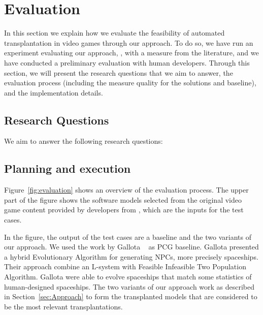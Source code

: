 \section{Evaluation} \label{sec:Evaluation}

In this section we explain how we evaluate the feasibility of automated transplantation in video games through our \ApproachName{} approach. To do so, we have run an experiment evaluating our approach, \ApproachName, with a measure from the literature, and we have conducted a preliminary evaluation with human developers.
Through this section, we will present the research questions that we aim to answer, the evaluation
process (including the measure quality for the solutions and baseline), and the implementation details.

\subsection{Research Questions}
We aim to answer the following research questions:

\subsection{Planning and execution}

Figure~\ref{fig:evaluation} shows an overview of the evaluation process. The upper part of the figure shows the software models selected from the original video game content provided by developers from \CaseStudy{}, which are the inputs for the test cases. 

In the figure, the output of the test cases are a baseline and the two variants of our approach. We used the work by Gallota \etal~\cite{gallotta2022evolving} as PCG baseline. Gallota \etal presented a hybrid Evolutionary Algorithm for generating NPCs, more precisely spaceships. Their approach combine an L-system with Feasible Infeasible Two Population Algorithm. Gallota \etal were able to evolve spaceships that match some statistics of human-designed spaceships.
The two variants of our \ApproachName{} approach work as
described in Section~\ref{sec:Approach} to form the transplanted models that are considered to be the most relevant transplantations.

